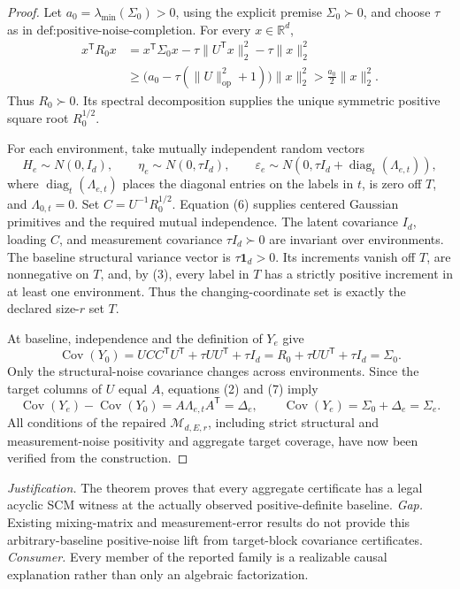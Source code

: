 \documentclass{article}
\begin{document}
\begin{proof}
Let \(a_0=\lambda_{\min}(\Sigma_0)>0\), using the explicit premise \(\Sigma_0\succ0\), and choose \(\tau\) as in \(\text{def:positive-noise-completion}\).  For every \(x\in\mathbb R^d\),
\[
 \begin{aligned}
 x^{\mathsf T}R_0x
 &=x^{\mathsf T}\Sigma_0x-\tau\lVert U^{\mathsf T}x\rVert_2^2-\tau\lVert x\rVert_2^2\\
 &\ge\bigl(a_0-\tau(\lVert U\rVert_{\mathrm{op}}^2+1)\bigr)\lVert x\rVert_2^2
 >\frac{a_0}{2}\lVert x\rVert_2^2.
 \end{aligned} \tag{5}
\]
Thus \(R_0\succ0\).  Its spectral decomposition supplies the unique symmetric positive square root \(R_0^{1/2}\).

For each environment, take mutually independent random vectors
\[
 H_e\sim N(0,I_d),\qquad
 \eta_e\sim N(0,\tau I_d),\qquad
 \varepsilon_e\sim N\!\left(0,\tau I_d+
 \operatorname{diag}_t(\Lambda_{e,t})\right), \tag{6}
\]
where \(\operatorname{diag}_t(\Lambda_{e,t})\) places the diagonal entries on the labels in \(t\), is zero off \(T\), and \(\Lambda_{0,t}=0\).  Set \(C=U^{-1}R_0^{1/2}\).  Equation (6) supplies centered Gaussian primitives and the required mutual independence.  The latent covariance \(I_d\), loading \(C\), and measurement covariance \(\tau I_d\succ0\) are invariant over environments.  The baseline structural variance vector is \(\tau\mathbf 1_d>0\).  Its increments vanish off \(T\), are nonnegative on \(T\), and, by (3), every label in \(T\) has a strictly positive increment in at least one environment.  Thus the changing-coordinate set is exactly the declared size-\(r\) set \(T\).

At baseline, independence and the definition of \(Y_e\) give
\[
 \operatorname{Cov}(Y_0)
 =UCC^{\mathsf T}U^{\mathsf T}+\tau UU^{\mathsf T}+\tau I_d
 =R_0+\tau UU^{\mathsf T}+\tau I_d=\Sigma_0. \tag{7}
\]
Only the structural-noise covariance changes across environments.  Since the target columns of \(U\) equal \(A\), equations (2) and (7) imply
\[
 \operatorname{Cov}(Y_e)-\operatorname{Cov}(Y_0)
 =A\Lambda_{e,t}A^{\mathsf T}=\Delta_e,
 \qquad
 \operatorname{Cov}(Y_e)=\Sigma_0+\Delta_e=\Sigma_e. \tag{8}
\]
All conditions of the repaired \(\mathcal M_{d,E,r}\), including strict structural and measurement-noise positivity and aggregate target coverage, have now been verified from the construction.
\end{proof}
\par\smallskip\noindent \textit{Justification.} The theorem proves that every aggregate certificate has a legal acyclic SCM witness at the actually observed positive-definite baseline. \textit{Gap.} Existing mixing-matrix and measurement-error results do not provide this arbitrary-baseline positive-noise lift from target-block covariance certificates. \textit{Consumer.} Every member of the reported family is a realizable causal explanation rather than only an algebraic factorization.
\end{document}
